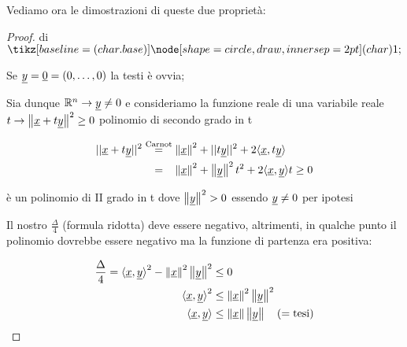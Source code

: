 Vediamo ora le dimostrazioni di queste due proprietà:

\begin{proof} di \(\circled{1}\)

    Se \(\underline{y} = \underline{0} = (0, \ldots ,0)\) la testi è ovvia;

    Sia dunque \(\mathbb{R}^{n}  \rightarrow \underline{y} \neq 0\) e consideriamo la funzione reale di una variabile reale \(t \rightarrow \left\lVert\underline{x}+t\underline{y}\right\rVert^{2}\ge 0\) polinomio di secondo grado in t

    \begin{align*}
        ||\underline{x} + t\underline{y}|| ^{2} & \overset{\text{Carnot}}{=} \left\lVert\underline{x}\right\rVert^{2} + ||t\underline{y}||^{2} + 2\langle \underline{x},t\underline{y} \rangle \\
                            & ~~\, = ~~\, \left\lVert\underline{x}\right\rVert^{2} + \left\lVert\underline{y}\right\rVert^{2}t^{2} + 2 \langle\underline{x},\underline{y}\rangle t \ge 0
    \end{align*}

    è un polinomio di II grado in t dove \(\left\lVert\underline{y}\right\rVert^{2}> 0 \) essendo \(\underline{y} \neq 0\) per ipotesi

    Il nostro \(\frac{\Delta}{4}\) (formula ridotta) deve essere negativo, altrimenti, in qualche punto il polinomio dovrebbe essere negativo ma la funzione di partenza era positiva:

    \begin{align*}
        \frac{\Delta}{4} = {\langle\underline{x},\underline{y}\rangle}^{2} - \left\lVert\underline{x}\right\rVert^{2}\left\lVert\underline{y}\right\rVert^{2} & \le 0                                       \\
        {\langle\underline{x},\underline{y}\rangle}^{2}                                               & \le \left\lVert\underline{x}\right\rVert^{2}\left\lVert\underline{y}\right\rVert^{2}                \\
        \langle\underline{x},\underline{y}\rangle                                                     & \le \left\lVert\underline{x}\right\rVert \left\lVert\underline{y}\right\rVert \quad (= \text{tesi})
    \end{align*}

\end{proof}

\filbreak{}

